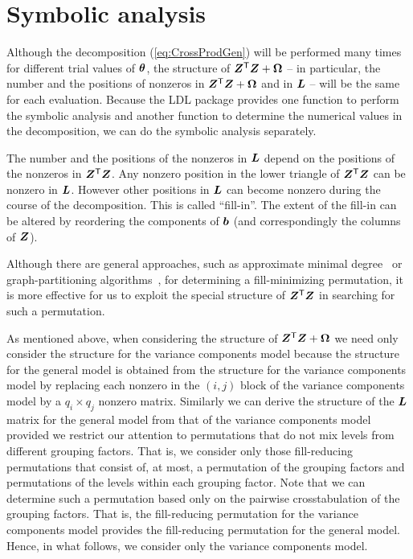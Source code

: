 \documentclass[12pt]{article}
\begin{document}
\section{Symbolic analysis}
\label{sec:Symbolic}

Although the decomposition (\ref{eq:CrossProdGen}) will be performed
many times for different trial values of $\bm{\theta}$, the structure of
$\bm{Z}^\mathsf{T}\bm{Z}+\bm{\Omega}$ -- in particular, the number and the positions of
nonzeros in $\bm{Z}^\mathsf{T}\bm{Z}+\bm{\Omega}$ and in $\bm{L}$ -- will be the
same for each evaluation.  Because the LDL package provides one
function to perform the symbolic analysis and another function to
determine the numerical values in the decomposition, we can do
the symbolic analysis separately.

The number and the positions of the nonzeros in $\bm{L}$ depend on the
positions of the nonzeros in $\bm{Z}^\mathsf{T}\bm{Z}$. Any nonzero position in
the lower triangle of $\bm{Z}^\mathsf{T}\bm{Z}$ can be nonzero in $\bm{L}$.
However other positions in $\bm{L}$ can become nonzero during the course
of the decomposition.  This is called ``fill-in''.  The extent of the
fill-in can be altered by reordering the components of $\bm{b}$ (and
correspondingly the columns of $\bm{Z}$).

Although there are general approaches, such as approximate minimal
degree~\citep{Davis:1996} or graph-partitioning
algorithms~\citep{Metis}, for determining a fill-minimizing
permutation, it is more effective for us to exploit the special
structure of $\bm{Z}^\mathsf{T}\bm{Z}$ in searching for such a permutation.

As mentioned above, when considering the structure of
$\bm{Z}^\mathsf{T}\bm{Z}+\bm{\Omega}$ we need only consider the structure for the
variance components model because the structure for the general model
is obtained from the structure for the variance components model by
replacing each nonzero in the $(i,j)$ block of the variance components
model by a $q_i\times q_j$ nonzero matrix.  Similarly we can derive
the structure of the $\bm{L}$ matrix for the general model from that of
the variance components model provided we restrict our attention to
permutations that do not mix levels from different grouping factors.
That is, we consider only those fill-reducing permutations that
consist of, at most, a permutation of the grouping factors and
permutations of the levels within each grouping factor.  Note that we
can determine such a permutation based only on the pairwise
crosstabulation of the grouping factors.  That is, the
fill-reducing permutation for the variance components model provides
the fill-reducing permutation for the general model.  Hence, in what
follows, we consider only the variance components model.
\end{document}
